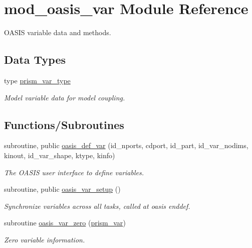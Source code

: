 \hypertarget{namespacemod__oasis__var}{}\section{mod\+\_\+oasis\+\_\+var Module Reference}
\label{namespacemod__oasis__var}


O\+A\+S\+IS variable data and methods.  


\subsection*{Data Types}
\begin{DoxyCompactItemize}
\item 
type \hyperlink{structmod__oasis__var_1_1prism__var__type}{prism\+\_\+var\+\_\+type}
\begin{DoxyCompactList}\small\item\em Model variable data for model coupling. \end{DoxyCompactList}\end{DoxyCompactItemize}
\subsection*{Functions/\+Subroutines}
\begin{DoxyCompactItemize}
\item 
subroutine, public \hyperlink{namespacemod__oasis__var_a7d16403015304fadc15624773f87d2a0}{oasis\+\_\+def\+\_\+var} (id\+\_\+nports, cdport, id\+\_\+part, id\+\_\+var\+\_\+nodims, kinout, id\+\_\+var\+\_\+shape, ktype, kinfo)
\begin{DoxyCompactList}\small\item\em The O\+A\+S\+IS user interface to define variables. \end{DoxyCompactList}\item 
subroutine, public \hyperlink{namespacemod__oasis__var_ab33b7fbec62bcfd15e9cd7f912f71035}{oasis\+\_\+var\+\_\+setup} ()
\begin{DoxyCompactList}\small\item\em Synchronize variables across all tasks, called at oasis enddef. \end{DoxyCompactList}\item 
subroutine \hyperlink{namespacemod__oasis__var_aa780f62e9eded0a55d0077a990bf2443}{oasis\+\_\+var\+\_\+zero} (\hyperlink{namespacemod__oasis__var_ae66c490437c2960d795fbd3d2c773a0a}{prism\+\_\+var})
\begin{DoxyCompactList}\small\item\em Zero variable information. \end{DoxyCompactList}\end{DoxyCompactItemize}
